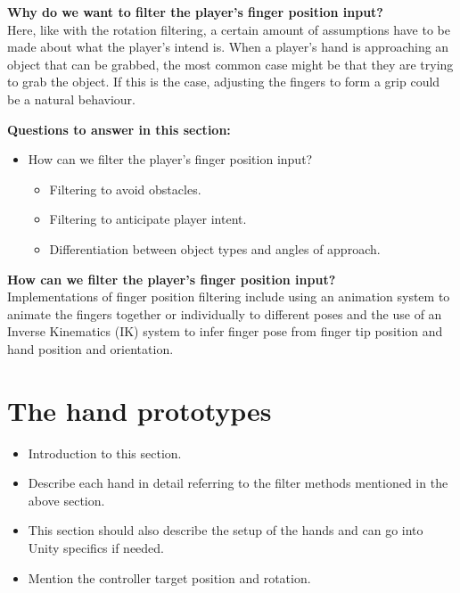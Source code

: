 \textbf{Why do we want to filter the player's finger position input?}\\
Here, like with the rotation filtering, a certain amount of assumptions have to be made about what the player's intend is. When a player's hand is approaching an object that can be grabbed, the most common case might be that they are trying to grab the object. If this is the case, adjusting the fingers to form a grip could be a natural behaviour.


\textbf{Questions to answer in this section:}
\begin{itemize}
\setlength\itemsep{-0.1cm}
\item How can we filter the player's finger position input?
\begin{itemize}
\setlength\itemsep{-0.1cm}
\item Filtering to avoid obstacles.
\item Filtering to anticipate player intent.
\item Differentiation between object types and angles of approach.
\end{itemize}
\end{itemize}

\textbf{How can we filter the player's finger position input?}\\
Implementations of finger position filtering include using an animation system to animate the fingers together or individually to different poses and the use of an Inverse Kinematics (IK) system to infer finger pose from finger tip position and hand position and orientation.


\section{The hand prototypes}
\label{sec:handPrototypes}
\begin{itemize}
\setlength\itemsep{-0.1cm}
\item Introduction to this section.
\item Describe each hand in detail referring to the filter methods mentioned in the above section.
\item This section should also describe the setup of the hands and can go into Unity specifics if needed.
\item Mention the controller target position and rotation.
\end{itemize}

